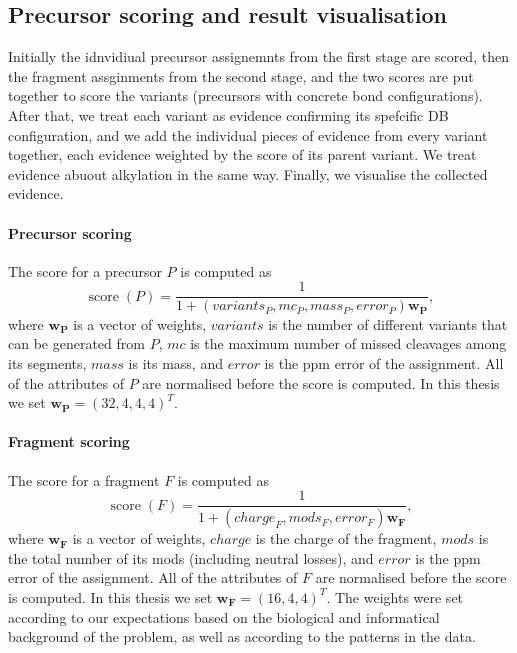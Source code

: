 \subsection{Precursor scoring and result visualisation}

Initially the idnvidiual precursor assignemnts from the first stage are scored, then the fragment assginments from the second stage, and the two scores are put together to score the variants (precursors with concrete bond configurations). After that, we treat each variant as evidence confirming its spefcific DB configuration, and we add the individual pieces of evidence from every variant together, each evidence weighted by the score of its parent variant. We treat evidence abuout alkylation in the same way. Finally, we visualise the collected evidence.

\paragraph{Precursor scoring} The score for a precursor \(P\) is computed as \[\operatorname{score}(P) = \frac{1}{1 + (\mathit{variants}_P, \mathit{mc}_P, \mathit{mass}_P, \mathit{error}_P)\bm{w_P}},\] where \(\bm{w_P}\) is a vector of weights, \(\mathit{variants}\) is the number of different variants that can be generated from \(P\), \(\mathit{mc}\) is the maximum number of missed cleavages among its segments, \(\mathit{mass}\) is its mass, and \(\mathit{error}\) is the ppm error of the assignment. All of the attributes of \(P\) are normalised before the score is computed. In this thesis we set \(\bm{w_P} = (32, 4, 4, 4)^T\).

\paragraph{Fragment scoring} The score for a fragment \(F\) is computed as \[\operatorname{score}(F) = \frac{1}{1 + (\mathit{charge}_F, \mathit{mods}_F, \mathit{error}_F)\bm{w_F}},\] where \(\bm{w_F}\) is a vector of weights, \(\mathit{charge}\) is the charge of the fragment, \(\mathit{mods}\) is the total number of its mods (including neutral losses), and \(\mathit{error}\) is the ppm error of the assignment. All of the attributes of \(F\) are normalised before the score is computed. In this thesis we set \(\bm{w_F} = (16, 4, 4)^T\). The weights were set according to our expectations based on the biological and informatical background of the problem, as well as according to the patterns in the data.

